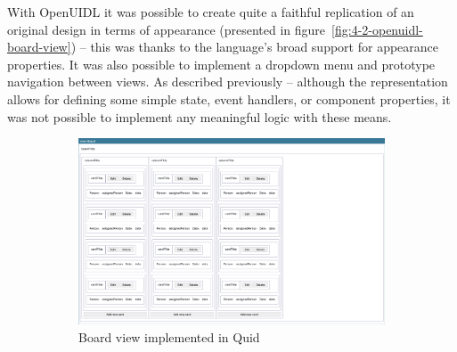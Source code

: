 With OpenUIDL it was possible to create quite a faithful replication of an original design in terms of appearance (presented in figure~\ref{fig:4-2-openuidl-board-view}) -- this was thanks to the language's broad support for appearance properties.
It was also possible to implement a dropdown menu and prototype navigation between views.
As described previously -- although the representation allows for defining some simple state, event handlers, or component properties, it was not possible to implement any meaningful logic with these means.

\begin{figure}
    \centering
    \begin{subfigure}[m]{0.5\textwidth}
        \centering
        \includegraphics[height=0.2\textheight]{./4-results-and-discussion/quid-board-view}
        \caption{Board view implemented in Quid}
        \label{fig:4-2-quid-board-view}
    \end{subfigure}
    \hfill
    \begin{subfigure}[m]{0.35\textwidth}
        \centering

\end{subfigure}
\end{figure}
